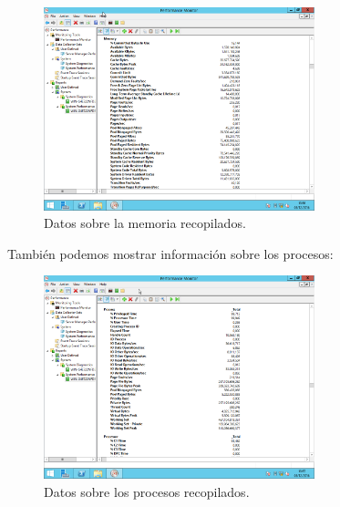 \begin{figure}[H]
	\begin{center}
		\includegraphics[width=0.7\textwidth]{Imagenes/Datos_grafico_diagnostico}
		\caption{Datos sobre la memoria recopilados.} \label{fig:11}
	\end{center}
\end{figure}

También podemos mostrar información sobre los procesos:
\begin{figure}[H]
	\begin{center}
		\includegraphics[width=0.7\textwidth]{Imagenes/Datos_grafico_diagnostico_2}
		\caption{Datos sobre los procesos recopilados.} \label{fig:12}
	\end{center}
\end{figure}

